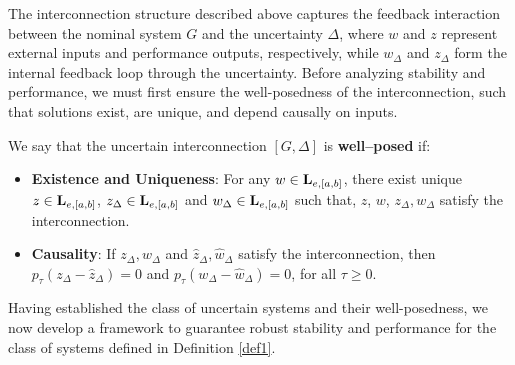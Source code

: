 The interconnection structure described above captures the feedback interaction between the nominal system $G$ and the uncertainty $\Delta$, where $w$ and $z$ represent external inputs and performance outputs, respectively, while $w_\Delta$ and $z_\Delta$ form the internal feedback loop through the uncertainty. Before analyzing stability and performance, we must first ensure the well-posedness of the interconnection, such that solutions exist, are unique, and depend causally on inputs.
\begin{definition}
	We say that the uncertain interconnection $[G,\Delta]$ is \textbf{well--posed} if:
	\begin{itemize}
		\item \textbf{Existence and Uniqueness}: For any $w\in \mathbf{L}_{e, [a, b]}$, there exist unique $z\in\mathbf{L}_{e, [a, b]}$, $z_\Delta \in \mathbf{L}_{e, [a, b]}$ and $w_\Delta \in  \mathbf{L}_{e, [a, b]}$ such that, $z$, $w$, $z_\Delta, w_\Delta$ satisfy the interconnection.
		\item \textbf{Causality}: If $z_\Delta, w_\Delta$ and $\hat{z}_\Delta, \hat{w}_\Delta$ satisfy the interconnection, then $p_\tau(z_\Delta - \hat{z}_\Delta) = 0$ and $p_\tau(w_\Delta - \hat{w}_\Delta) = 0$, for all $\tau \geq 0$.
	\end{itemize}
\end{definition}
Having established the class of uncertain systems and their well-posedness, we now develop a framework to guarantee robust stability and performance for the class of systems defined in Definition \ref{def1}.
